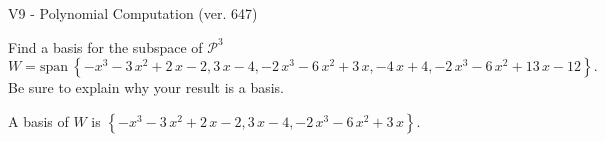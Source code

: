 \begin{exercise}
  \begin{exerciseTitle}V9 - Polynomial Computation (ver. 647)\end{exerciseTitle}
  \begin{exerciseStatement}
    Find a basis for the subspace of \(\mathcal{P}^3\) 
\[W=\mathrm{span}\ \left\{-x^{3} - 3 \, x^{2} + 2 \, x - 2 , 3 \, x - 4 , -2 \, x^{3} - 6 \, x^{2} + 3 \, x , -4 \, x + 4 , -2 \, x^{3} - 6 \, x^{2} + 13 \, x - 12\right\}.\]
 Be sure to explain why your result is a basis.


  \end{exerciseStatement}
  \begin{exerciseAnswer}
   A basis of \(W\) is  \(\left\{-x^{3} - 3 \, x^{2} + 2 \, x - 2 , 3 \, x - 4 , -2 \, x^{3} - 6 \, x^{2} + 3 \, x\right\}\).
  


  \end{exerciseAnswer}
\end{exercise}